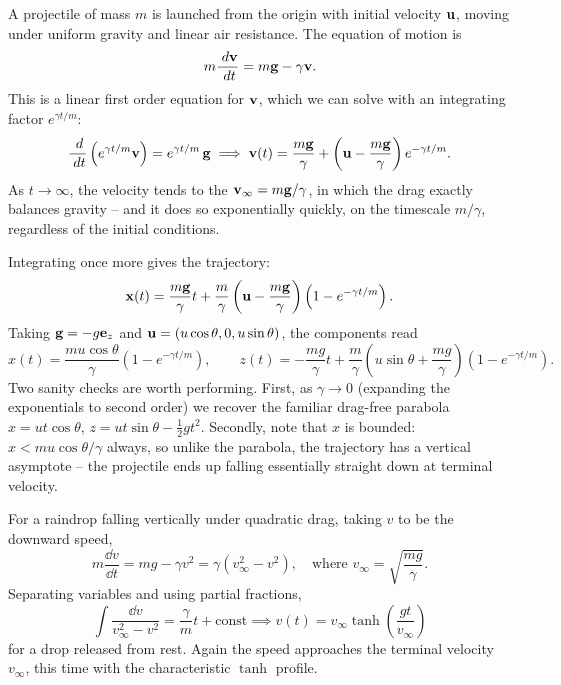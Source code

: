 \documentclass[a4paper]{scrartcl}
\begin{document}
\begin{example}
	A projectile of mass $m$ is launched from the origin with initial velocity $\mathbf{u}$, moving under uniform gravity and linear air resistance. The equation of motion is
	$$
	m \frac{\; d \mathbf{v}}{\; d t} = m \mathbf{g} - \gamma \mathbf{v}.
	$$
	This is a linear first order equation for $\mathbf{v}$, which we can solve with an integrating factor $e^{\gamma t/m}$:
	$$
	\frac{\; d}{\; d t}\left(e^{\gamma t/m} \mathbf{v}\right) = e^{\gamma t/m}\, \mathbf{g} \implies \mathbf{v}(t) = \frac{m \mathbf{g}}{\gamma} + \left(\mathbf{u} - \frac{m \mathbf{g}}{\gamma}\right)e^{-\gamma t/m}.
	$$
	As $t \to \infty$, the velocity tends to the  $\mathbf{v}_\infty = m\mathbf{g}/\gamma$, in which the drag exactly balances gravity -- and it does so exponentially quickly, on the timescale $m/\gamma$, regardless of the initial conditions.

	Integrating once more gives the trajectory:
	$$
	\mathbf{x}(t) = \frac{m \mathbf{g}}{\gamma} t + \frac{m}{\gamma}\left(\mathbf{u} - \frac{m \mathbf{g}}{\gamma}\right)\left(1 - e^{-\gamma t/m}\right).
	$$
	Taking $\mathbf{g} = -g \mathbf{e}_z$ and $\mathbf{u} = (u \cos \theta, 0, u \sin \theta)$, the components read
	$$
	x(t) = \frac{mu\cos\theta}{\gamma}\left(1 - e^{-\gamma t/m}\right), \qquad z(t) = -\frac{mg}{\gamma}t + \frac{m}{\gamma}\left(u \sin\theta + \frac{mg}{\gamma}\right)\left(1 - e^{-\gamma t/m}\right).
	$$
	Two sanity checks are worth performing. First, as $\gamma \to 0$ (expanding the exponentials to second order) we recover the familiar drag-free parabola $x = ut\cos\theta$, $z = ut \sin \theta - \frac{1}{2}gt^2$. Secondly, note that $x$ is bounded: $x < mu\cos\theta/\gamma$ always, so unlike the parabola, the trajectory has a vertical asymptote -- the projectile ends up falling essentially straight down at terminal velocity.
\end{example}

\begin{example}
	For a raindrop falling vertically under quadratic drag, taking $v$ to be the downward speed,
	$$
	m \frac{\dd v}{\dd t} = mg - \gamma v^2 = \gamma\left(v_\infty^2 - v^2\right), \quad \text{where } v_\infty = \sqrt{\frac{mg}{\gamma}}.
	$$
	Separating variables and using partial fractions,
	$$
	\int \frac{\dd v}{v_\infty^2 - v^2} = \frac{\gamma}{m} t + \text{const} \implies v(t) = v_\infty \tanh\left(\frac{g t}{v_\infty}\right)
	$$
	for a drop released from rest. Again the speed approaches the terminal velocity $v_\infty$, this time with the characteristic $\tanh$ profile.
\end{example}
\end{document}
